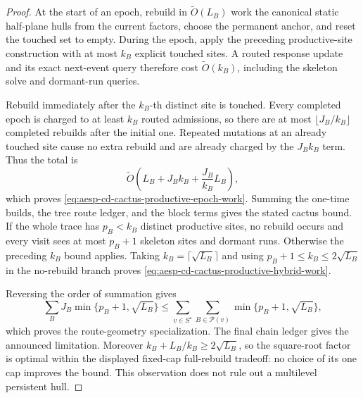 \begin{proof}
At the start of an epoch, rebuild in $\widetilde O(L_B)$ work the canonical
static half-plane hulls from the current factors, choose the permanent anchor,
and reset the touched set to empty.  During the epoch, apply the preceding
productive-site construction with at most $k_B$ explicit touched sites.  A
routed response update and its exact next-event query therefore cost
$\widetilde O(k_B)$, including the skeleton solve and dormant-run queries.

Rebuild immediately after the $k_B$-th distinct site is touched.  Every
completed epoch is charged to at least $k_B$ routed admissions, so there are
at most $\lfloor J_B/k_B\rfloor$ completed rebuilds after the initial one.
Repeated mutations at an already touched site cause no extra rebuild and are
already charged by the $J_Bk_B$ term.  Thus the total is
\begin{equation*}
 \widetilde O\!\left(
  L_B+J_Bk_B+\frac{J_B}{k_B}L_B
 \right),
\end{equation*}
which proves \cref{eq:aesp-cd-cactus-productive-epoch-work}.  Summing the
one-time builds, the tree route ledger, and the block terms gives the stated
cactus bound.  If the whole trace has $p_B<k_B$ distinct productive sites,
no rebuild occurs and every visit sees at most $p_B+1$ skeleton sites and
dormant runs.  Otherwise the preceding $k_B$ bound applies.  Taking
$k_B=\lceil\sqrt{L_B}\rceil$ and using
$p_B+1\leq k_B\leq2\sqrt{L_B}$ in the no-rebuild branch proves
\cref{eq:aesp-cd-cactus-productive-hybrid-work}.

Reversing the order of summation gives
\begin{equation*}
 \sum_B J_B\min\{p_B+1,\sqrt{L_B}\}
 \leq
 \sum_{v\in S^\star}\sum_{B\in\mathcal P(v)}
       \min\{p_B+1,\sqrt{L_B}\},
\end{equation*}
which proves the route-geometry specialization.  The final chain ledger gives
the announced limitation.  Moreover
$k_B+L_B/k_B\geq2\sqrt{L_B}$, so the square-root factor is optimal within
the displayed fixed-cap full-rebuild tradeoff: no choice of its one cap
improves the bound.  This observation does not rule out a multilevel
persistent hull.
\end{proof}
